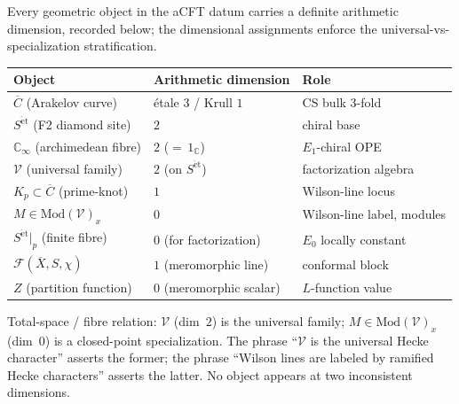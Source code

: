 \begin{remark}
\label{v4-arith:rem:aCFT-dimensions}
Every geometric object in the aCFT datum carries a definite
arithmetic dimension, recorded below; the dimensional assignments
enforce the universal-vs-specialization stratification.
\begin{center}
\begin{tabular}{lll}
Object & Arithmetic dimension & Role \\
\hline
\(\overline{C}\) (Arakelov curve) & \'etale \(3\) / Krull \(1\) & CS bulk 3-fold \\
\(S^{\mathrm{\acute{e}t}}\) (F2 diamond site) & \(2\) & chiral base \\
\(\mathbb{C}_{\infty}\) (archimedean fibre) & \(2\) (\({=}\,1_{\mathbb{C}}\)) & \(E_{1}\)-chiral OPE \\
\(\mathcal{V}\) (universal family) & \(2\) (on \(S^{\mathrm{\acute{e}t}}\)) & factorization algebra \\
\(K_{p}\subset\overline{C}\) (prime-knot) & \(1\) & Wilson-line locus \\
\(M\in\mathrm{Mod}(\mathcal{V})_{x}\) & \(0\) & Wilson-line label, modules \\
\(S^{\mathrm{\acute{e}t}}|_{p}\) (finite fibre) & \(0\) (for factorization) & \(E_{0}\) locally constant \\
\(\mathcal{F}(\overline{X},S,\chi)\) & \(1\) (meromorphic line) & conformal block \\
\(Z\) (partition function) & \(0\) (meromorphic scalar) & \(L\)-function value
\end{tabular}
\end{center}
Total-space / fibre relation: \(\mathcal{V}\) (dim~\(2\)) is the
universal family; \(M\in\mathrm{Mod}(\mathcal{V})_{x}\) (dim~\(0\)) is
a closed-point specialization. The phrase ``\(\mathcal{V}\) is the
universal Hecke character'' asserts the former; the phrase
``Wilson lines are labeled by ramified Hecke characters'' asserts
the latter. No object appears at two inconsistent dimensions.
\end{remark}


